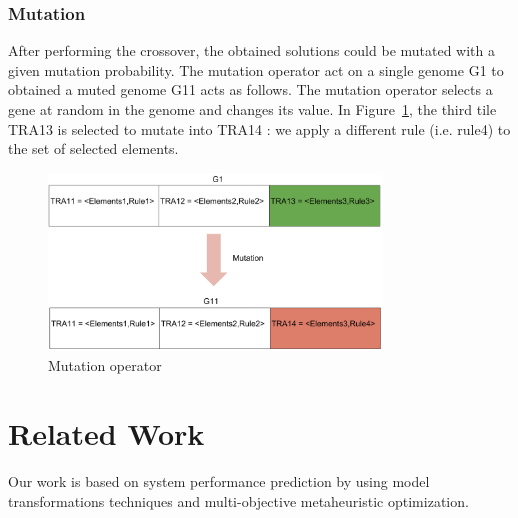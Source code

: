 \documentclass[conference]{IEEEtran}
\begin{document}
\subsubsection{\textbf{Mutation}}
After performing the crossover, the obtained solutions could be mutated with a given mutation probability.
The mutation operator act on a single genome G1 to obtained a muted genome G11 acts as follows. The mutation operator selects a gene at random in the genome and changes its value. In Figure~\ref{mutation}, the third tile TRA13 is selected to mutate into TRA14 : we apply a different rule (i.e. rule4) to the set of selected elements.



\begin{figure}[!t]
\centering
\includegraphics[width=3.49in]{mutation.pdf}
\caption{Mutation operator}
\label{mutation}
\end{figure}




\section{Related Work}
\label{Related}
Our work is based on system performance prediction\cite{1291833} by using model transformations techniques and multi-objective metaheuristic optimization\cite{Coello98acomprehensive}.
\end{document}
